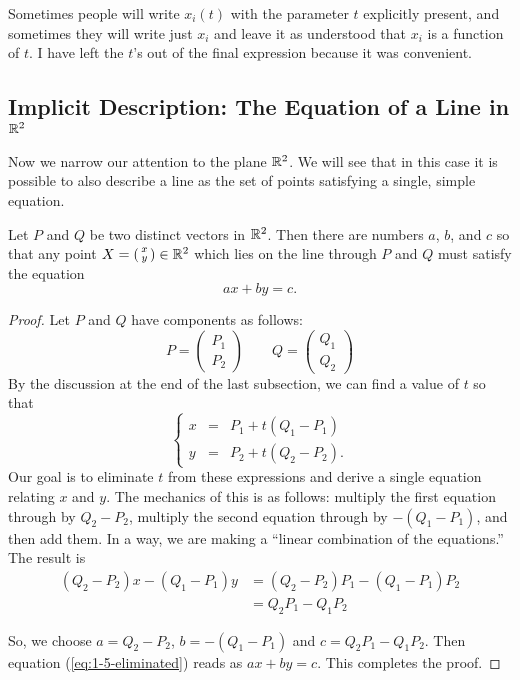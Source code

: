 \documentclass[elementsmain.tex]{subfiles}
\begin{document}
Sometimes people will write $x_i(t)$ with the parameter $t$ explicitly present, and sometimes they will write just $x_i$ and leave it as understood that $x_i$ is a function of $t$. I have left the $t$'s out of the final expression because it was convenient.


\subsection*{Implicit Description: The Equation of a Line in $\mathbb{R}^2$}

Now we narrow our attention to the plane $\mathbb{R}^2$. We will see that in this case
it is possible to also describe a line as the set of points satisfying a single, 
simple equation.

\begin{theorem}
Let $P$ and $Q$ be two distinct vectors in $\mathbb{R}^2$. Then there are numbers $a$, $b$, and $c$ so that any point $X = \left(\begin{smallmatrix} x \\ y \end{smallmatrix}\right) \in \mathbb{R}^2$ which lies on the line through $P$ and $Q$ must satisfy the equation
\[
ax + by = c.
\]
\end{theorem}

\begin{proof}
Let $P$ and $Q$ have components as follows:
\[
P = \begin{pmatrix} P_1 \\ P_2 \end{pmatrix}
\qquad
Q = \begin{pmatrix} Q_1 \\ Q_2 \end{pmatrix}
\]
By the discussion at the end of the last subsection, we can find a value of $t$ so that 
\[
\left\{ \begin{array}{ccc}
x & = & P_1 + t(Q_1 - P_1) \\
y & = & P_2 + t(Q_2 - P_2) .
\end{array}\right.
\]
Our goal is to eliminate $t$ from these expressions and derive a single equation relating $x$ and $y$. The mechanics of this is as follows: multiply the first equation through by $Q_2-P_2$, multiply the second equation through by $-(Q_1-P_1)$, and then add them. In a way, we are making a ``linear combination of the equations.'' The result is
\begin{equation}
\label{eq:1-5-eliminated}
\begin{split}
(Q_2-P_2) x - (Q_1-P_1) y & = (Q_2 - P_2) P_1 - (Q_1-P_1) P_2 \\
&  = Q_2 P_1 - Q_1P_2
\end{split}
\end{equation}

So, we choose $a = Q_2-P_2$, $b= -(Q_1-P_1)$ and $c = Q_2 P_1 - Q_1P_2$. Then equation (\ref{eq:1-5-eliminated}) reads as $ax + by = c$. This completes the proof.
\end{proof}
\end{document}
